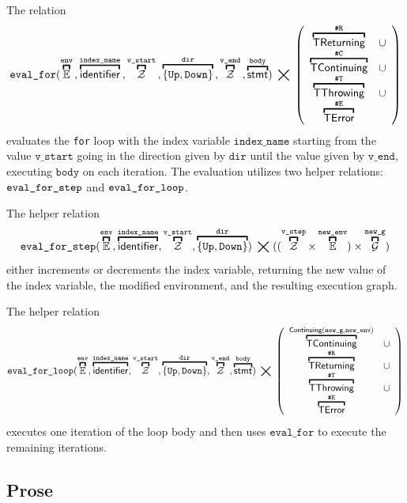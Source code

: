 \documentclass{book}
\newcommand\overname[2]{\overbracket{#1}^{#2}}
\newcommand\XGraphs[0]{\mathcal{G}}
\newcommand\tint[0]{\mathcal{Z}}
\newcommand\aslrel[0]{\bigtimes}
\newcommand\aslsep[0]{\mathbf{,}}
\newcommand\ContinuingConfig[0]{\texttt{\#C}}
\newcommand\ReturningConfig[0]{\texttt{\#R}}
\newcommand\ThrowingConfig[0]{\texttt{\#T}}
\newcommand\ErrorConfig[0]{\texttt{\#E}}
\newcommand\TError[0]{\textsf{TError}}
\newcommand\TThrowing[0]{\textsf{TThrowing}}
\newcommand\TContinuing[0]{\textsf{TContinuing}}
\newcommand\TReturning[0]{\textsf{TReturning}}
\newcommand\evalfor[1]{\texttt{eval\_for}(#1)}
\newcommand\Continuing[0]{\textsf{Continuing}}
\newcommand\newenv[0]{\texttt{new\_env}}
\newcommand\env[0]{\texttt{env}}
\newcommand\newg[0]{\texttt{new\_g}}
\newcommand\vstart[0]{\texttt{v\_start}}
\newcommand\vend[0]{\texttt{v\_end}}
\newcommand\vbody[0]{\texttt{body}}
\newcommand\dir[0]{\texttt{dir}}
\newcommand\vindexname[0]{\texttt{index\_name}}
\begin{document}
The relation
\[
  \evalfor{\overname{\envs}{\env} \aslsep \overname{\identifier}{\vindexname} \aslsep \overname{\tint}{\vstart}
  \aslsep \overname{\{\UP, \DOWN\}}{\dir} \aslsep \overname{\tint}{\vend} \aslsep \overname{\stmt}{\vbody}}
  \;\aslrel\;
  \left(
    \begin{array}{cl}
    \overname{\TReturning}{\ReturningConfig} & \cup\\
    \overname{\TContinuing}{\ContinuingConfig} & \cup\\
    \overname{\TThrowing}{\ThrowingConfig} & \cup \\
    \overname{\TError}{\ErrorConfig} &
    \end{array}
    \right)
\]
evaluates the \texttt{for} loop with the index variable $\vindexname$ starting from the value
$\vstart$ going in the direction given by $\dir$ until the value given by $\vend$,
executing $\vbody$ on each iteration.
%
The evaluation utilizes two helper relations: $\texttt{eval\_for\_step}$ and $\texttt{eval\_for\_loop}$.

The helper relation
\[
  \evalforstep(
    \overname{\envs}{\env},
    \overname{\identifier}{\vindexname},
    \overname{\tint}{\vstart},
    \overname{\{\UP,\DOWN\}}{\dir})
    \;\aslrel\;
    ((\overname{\tint}{\vstep} \times \overname{\envs}{\newenv}) \times \overname{\XGraphs}{\newg})
\]
either increments or decrements the index variable,
returning the new value of the index variable, the modified environment,
and the resulting execution graph.

The helper relation
\[
  \evalforloop(\overname{
    \envs}{\env},
    \overname{\identifier}{\vindexname},
    \overname{\tint}{\vstart},
    \overname{\{\UP,\DOWN\}}{\dir},
    \overname{\tint}{\vend},
    \overname{\stmt}{\vbody}) \;\aslrel\;
    \left(
    \begin{array}{cl}
      \overname{\TContinuing}{\Continuing(\newg, \newenv)} & \cup\\
      \overname{\TReturning}{\ReturningConfig} & \cup\\
    \overname{\TThrowing}{\ThrowingConfig} & \cup \\
    \overname{\TError}{\ErrorConfig} &
    \end{array}
    \right)
\]
executes one iteration of the loop body and then uses $\texttt{eval\_for}$ to execute the remaining
iterations.

\subsection{Prose}
\end{document}
